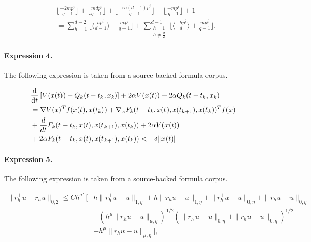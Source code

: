 \documentclass[11pt]{article}
\begin{document}
\begin{align*}&\lfloor\frac{-2mp^i}{q-1}\rfloor+\lfloor\frac{mdp^i}{q-1}\rfloor+\lfloor\frac{-m(d-1)p^i}{q-1}\rfloor-\lfloor\frac{-mp^i}{q-1}\rfloor+1\\&=\sum_{h=1}^{d-2}\lfloor\langle\frac{hp^i}{d-1}\rangle-\frac{mp^i}{q-1}\rfloor+\sum_{\substack{h=1\\h\neq\frac{d}{2}}}^{d-1}\lfloor\langle \frac{-hp^i}{d}\rangle+\frac{mp^i}{q-1}\rfloor.\end{align*}

\paragraph{Expression 4.} The following expression is taken from a source-backed formula corpus.

\begin{align*}&\frac{\textrm d}{\textrm dt} \left[V(x(t))+Q_k(t-t_k,x_{k})\right]+2\alpha V(x(t)) + 2\alpha Q_k(t-t_k,x_{k})\\&=\nabla V(x)^T f(x(t),x(t_k)) + \nabla_x F_k(t-t_k,x(t),x(t_{k+1}),x(t_k))^T f(x)\\& + \frac{d}{dt}F_k(t-t_k,x(t),x(t_{k+1}),x(t_k)) +2\alpha V(x(t))\\& + 2\alpha F_k(t-t_k,x(t),x(t_{k+1}),x(t_k))<-\delta\|x(t)\|\end{align*}

\paragraph{Expression 5.} The following expression is taken from a source-backed formula corpus.

\begin{align*}\|r_h^+ u - r_h u\|_{0,2} \le C h^{\sigma'} \, \Big[ &h\|r_h^+ u - u\|_{1,\eta} + h\|r_h u - u\|_{1,\eta} + \|r_h^+ u - u\|_{0,\eta} + \|r_h u - u\|_{0,\eta} \\&+ \left(h^\mu \|r_h u - u\|_{\mu,\eta}\right)^{1/2} \left(\|r_h^+ u - u\|_{0,\eta} + \|r_h u - u\|_{0,\eta} \right)^{1/2} \\&+ h^\mu \|r_h u - u\|_{\mu,\eta} \Big],\end{align*}
\end{document}
